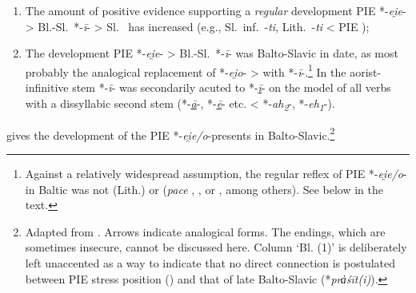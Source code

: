 \documentclass[output=paper,colorlinks,citecolor=brown]{langscibook}
\begin{document}
\begin{enumerate}
    \item The amount of positive evidence supporting a \textit{regular} development PIE *\nobreakdash-\textit{ei̯e}- > Bl.-Sl.\ *-\textit{ī}- > Sl.\  has increased (e.g., Sl.\ inf.\ -\textit{ti}, Lith.\ -\textit{ti} < PIE );

    \item The development PIE *-\textit{ei̯e}- > Bl.-Sl.\ *-\textit{ī}- was Balto-Slavic in date, as most probably the analogical replacement of *-\textit{ei̯o}- >  with *-\textit{ī}-.\footnote{Against a relatively widespread assumption, the regular reflex of PIE *-\textit{ei̯e/o}- in Baltic was not (Lith.)  or  (\textit{pace} \citealt[107]{Kortlandt1989}, \citealt[28]{Ostrowski2006}, or \citealt[207]{Jasanoff2017BSl}, among others). See below in the text.} In the aorist-infinitive stem *-\textit{ī}- was secondarily acuted to *-\textit{\underline{ī}}- on the model of all verbs with a dissyllabic second stem (*-\textit{\underline{ā}}-, *-\textit{\underline{ē}}- etc. < *-\textit{ah\textsubscript{2}}-, *-\textit{eh\textsubscript{1}}-).
\end{enumerate}

 gives the development of the PIE *-\textit{ei̯e/o}-presents in Balto-Slavic.\footnote{Adapted from \citet[198]{VillanuevaSvensson2023a}. Arrows indicate analogical forms. The endings, which are sometimes insecure, cannot be discussed here. Column `Bl. (1)' is deliberately left unaccented as a way to indicate that no direct connection is postulated between PIE stress position () and that of late Balto-Slavic (*\textit{pra̍śīt(i)}).}
\end{document}

